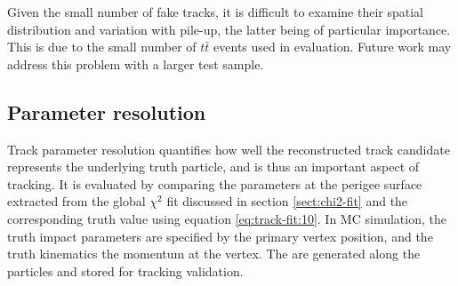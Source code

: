 Given the small number of fake tracks, it is difficult to examine their spatial distribution and variation with pile-up, the latter being of particular importance. 
This is due to the small number of $t\bar{t}$ events used in evaluation. 
Future work may address this problem with a larger test sample.

\newpage
\subsection{Parameter resolution}
\label{subsect:parameter-reso}

Track parameter resolution quantifies how well the reconstructed track candidate represents the underlying truth particle, and is thus an important aspect of tracking.
It is evaluated by comparing the parameters at the perigee surface extracted from the global $\chi^2$ fit discussed in section \ref{sect:chi2-fit} and the corresponding truth value using equation \ref{eq:track-fit:10}.
In MC simulation, the truth impact parameters are specified by the primary vertex position, and the truth kinematics the momentum at the vertex. 
The are generated along the particles and stored for tracking validation. 

